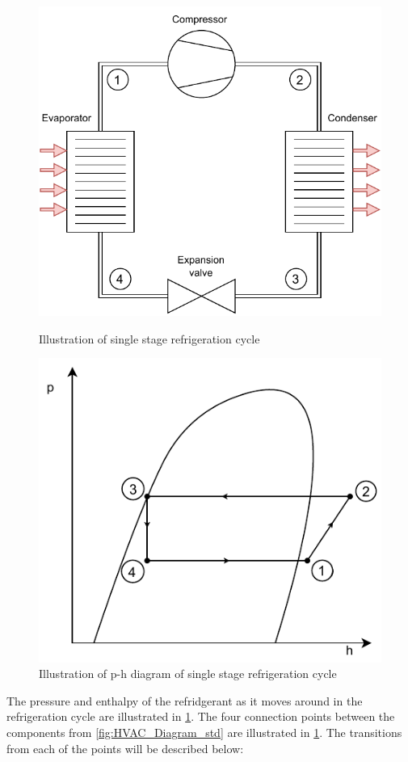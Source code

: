 \begin{figure}[h]
	\centering
	\begin{minipage}{0.5\textwidth}
		\centering
		\includegraphics[width=1\textwidth]{Graphics/HVAC_Diagram_std.pdf} %
		\caption{Illustration of single stage refrigeration cycle}
		\label{fig:HVAC_Diagram_std}
	\end{minipage}\hfill
	\begin{minipage}{0.5\textwidth}
		\centering
		\includegraphics[width=1\textwidth]{Graphics/p-h_diagram_std} %
		\caption{Illustration of p-h diagram of single stage refrigeration cycle}
		\label{fig:p-h_diagram_std}
	\end{minipage}
\end{figure}
The pressure and enthalpy of the refridgerant as it moves around in the refrigeration cycle are illustrated in \cref{fig:p-h_diagram_std}. The four connection points between the components from \cref{fig:HVAC_Diagram_std} are illustrated in \cref{fig:p-h_diagram_std}. The transitions from each of the points will be described below:

